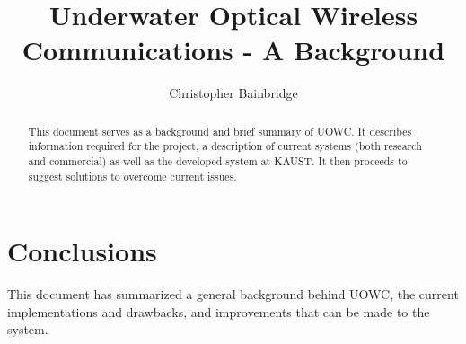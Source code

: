 \documentclass{article}
\author{Christopher Bainbridge}
\title{Underwater Optical Wireless Communications - A Background}
\begin{document}
\maketitle

\begin{abstract}
This document serves as a background and brief summary of \ac{UOWC}. It
describes information required for the project, a description of current
systems (both research and commercial) as well as the developed system at
\ac{KAUST}. It then proceeds to suggest solutions to overcome current
issues.
\end{abstract}








\section{Conclusions}
This document has summarized a general background behind \ac{UOWC}, the current
implementations and drawbacks, and improvements that can be made to the system.





\end{document}
